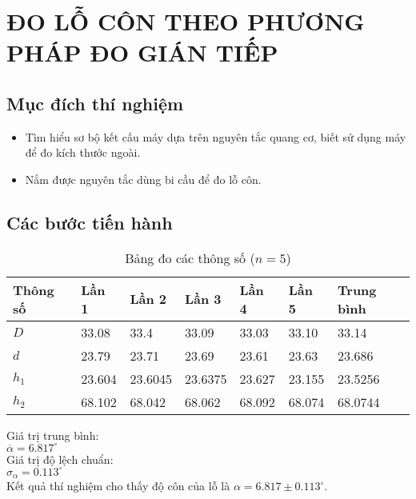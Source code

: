 \chapter{ĐO LỖ CÔN THEO PHƯƠNG PHÁP ĐO GIÁN TIẾP}

\section{Mục đích thí nghiệm}
\begin{itemize}
	\item Tìm hiểu sơ bộ kết cấu máy dựa trên nguyên tắc quang cơ, biết sử dụng máy để đo kích thước ngoài.
	\item Nắm được nguyên tắc dùng bi cầu để đo lỗ côn.
\end{itemize}

\section{Các bước tiến hành}

\begin{table}[ht]
	\centering
	\caption{Bảng đo các thông số ($ n=5 $)}
	\begin{tabular}{lllllll}\toprule
		Thông số & Lần 1 & Lần 2 & Lần 3 & Lần 4 & Lần 5 & Trung bình \\\midrule
		$ D $ & 33.08 & 33.4 & 33.09 & 33.03 & 33.10 & 33.14\\
		$ d $ & 23.79 & 23.71 & 23.69 & 23.61 & 23.63 & 23.686\\
		$ h_1 $ & 23.604 & 23.6045 & 23.6375 & 23.627 & 23.155 & 23.5256\\
		$ h_2 $ & 68.102 & 68.042 & 68.062 & 68.092 & 68.074 & 68.0744\\\bottomrule				
	\end{tabular}
\end{table}

Giá trị trung bình:\\
$ \overline{\alpha} = 6.817^\circ $\\

Giá trị độ lệch chuẩn:\\
$\sigma_\alpha = 0.113^\circ $\\

Kết quả thí nghiệm cho thấy độ côn của lỗ là $ \alpha = 6.817 \pm 0.113 ^\circ $.


